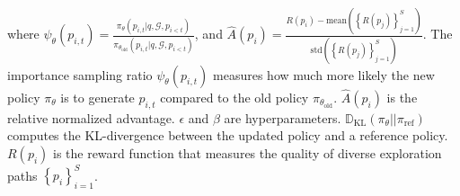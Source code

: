 where $ \psi _{\theta }(p_{i,t})=\frac{\pi_{\theta}(p_{i,t} | q,\mathcal{G} ,p_{i< t})}{\pi_{\theta_{\text{old}}}(p_{i,t} | q,\mathcal{G} ,p_{i< t})}$, and $ \hat{A}(p_i) =\frac{R(p_i) - \textrm{mean}\left (\left \{R(p_j) \right \}_{j=1}^{S}\right )}{\textrm{std}\left (\left \{R(p_j) \right \}_{j=1}^{S}\right )}$. 
The importance sampling ratio  $ \psi _{\theta }(p_{i,t})$ measures how much more likely the new policy $\pi_{\theta}$ is to generate $p_{i,t}$ compared to the old policy $\pi_{\theta_{\text{old}}}$.
$\hat{A}(p_i)$ is the relative normalized advantage.
$\epsilon$ and $\beta$ are hyperparameters.
$\mathbb{D}_{\text{KL}}(\pi_{\theta} || \pi_{\text{ref}})$ computes the KL-divergence between the updated policy and a reference policy.
$R(p_i)$ is the reward function that measures the quality of diverse exploration paths $\left \{ p_i \right \} _{i=1}^{S} $.


